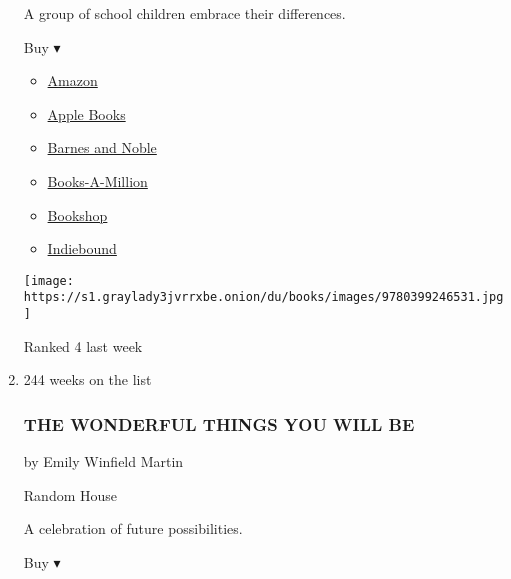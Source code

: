 \begin{enumerate}
  A group of school children embrace their differences.

  Buy ▾

  \begin{itemize}
  \tightlist
  \item
    \href{https://www.amazon.com/Day-You-Begin-Jacqueline-Woodson/dp/0399246533?tag=NYTBS-20}{Amazon}
  \item
    \href{https://du-gae-books-dot-nyt-du-prd.appspot.com/buy?title=THE+DAY+YOU+BEGIN\&author=Jacqueline+Woodson}{Apple
    Books}
  \item
    \href{https://www.anrdoezrs.net/click-7990613-11819508?url=https\%3A\%2F\%2Fwww.barnesandnoble.com\%2Fw\%2F\%3Fean\%3D9780399246531}{Barnes
    and Noble}
  \item
    \href{https://www.anrdoezrs.net/click-7990613-35140?url=https\%3A\%2F\%2Fwww.booksamillion.com\%2Fp\%2FTHE\%2BDAY\%2BYOU\%2BBEGIN\%2FJacqueline\%2BWoodson\%2F9780399246531}{Books-A-Million}
  \item
    \href{https://bookshop.org/a/3546/9780399246531}{Bookshop}
  \item
    \href{https://www.indiebound.org/book/9780399246531?aff=NYT}{Indiebound}
  \end{itemize}

  \texttt{[image: https://s1.graylady3jvrrxbe.onion/du/books/images/9780399246531.jpg]}

  Ranked 4 last week
\item
  244 weeks on the list

  \hypertarget{the-wonderful-things-you-will-be}{%
  \subsubsection{THE WONDERFUL THINGS YOU WILL
  BE}\label{the-wonderful-things-you-will-be}}

  by Emily Winfield Martin

  Random House

  A celebration of future possibilities.

  Buy ▾


\end{enumerate}
